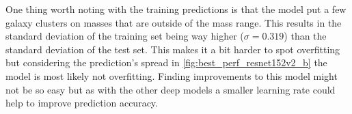 One thing worth noting with the training predictions is that the model put a few galaxy clusters on masses that are outside of the mass range. This results in the standard deviation of the training set being way higher ($\sigma = 0.319$) than the standard deviation of the test set. This makes it a bit harder to spot overfitting but considering the prediction's spread in \autoref{fig:best_perf_resnet152v2_b} the model is most likely not overfitting. Finding improvements to this model might not be so easy but as with the other deep models a smaller learning rate could help to improve prediction accuracy.